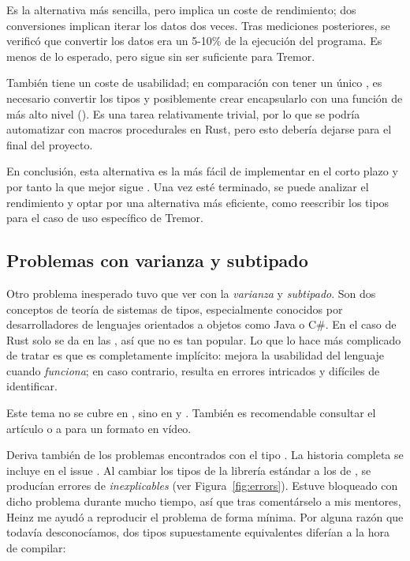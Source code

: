 Es la alternativa más sencilla, pero implica un coste de rendimiento; dos
conversiones implican iterar los datos dos veces. Tras mediciones posteriores,
se verificó que convertir los datos era un 5-10\% de la ejecución del programa.
Es menos de lo esperado, pero sigue sin ser suficiente para Tremor.

También tiene un coste de usabilidad; en comparación con tener un único
, es necesario convertir los tipos y posiblemente crear encapsularlo
con una función de más alto nivel (). Es una tarea
relativamente trivial, por lo que se podría automatizar con macros procedurales
en Rust, pero esto debería dejarse para el final del proyecto.

En conclusión, esta alternativa es la más fácil de implementar en el corto
plazo y por tanto la que mejor sigue \work. Una vez esté terminado, se puede
analizar el rendimiento y optar por una alternativa más eficiente, como
reescribir los tipos para el caso de uso específico de Tremor.

\subsection{Problemas con varianza y subtipado}

Otro problema inesperado tuvo que ver con la \emph{varianza} y \emph{subtipado}.
Son dos conceptos de teoría de sistemas de tipos, especialmente conocidos por
desarrolladores de lenguajes orientados a objetos como Java o C\#. En el caso de
Rust solo se da en las \lifetimes, así que no es tan popular. Lo que lo hace más
complicado de tratar es que es completamente implícito: mejora la usabilidad del
lenguaje cuando \emph{funciona}; en caso contrario, resulta en errores
intricados y difíciles de identificar.

Este tema no se cubre en \textcite{rustbook}, sino en \textcite[Subtyping and
Variance]{nomicon} y \textcite[Subtyping and Variance]{rustref}. También es
recomendable consultar el artículo \textcite{lcnr_covandcontra} o a
\textcite{video_covandcontra} para un formato en vídeo.

Deriva también de los problemas encontrados con el tipo . La
historia completa se incluye en el issue \textcite{abi_covandcontra}. Al cambiar
los tipos de la librería estándar a los de \abistable, se producían errores de
\lifetimes \emph{inexplicables} (ver Figura~\ref{fig:errors}). Estuve bloqueado
con dicho problema durante mucho tiempo, así que tras comentárselo a mis
mentores, Heinz me ayudó a reproducir el problema de forma mínima. Por alguna
razón que todavía desconocíamos, dos tipos supuestamente equivalentes diferían a
la hora de compilar:

